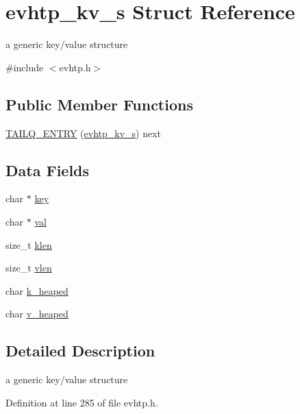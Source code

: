 \hypertarget{structevhtp__kv__s}{
\section{evhtp\_\-kv\_\-s Struct Reference}
\label{structevhtp__kv__s}
}


a generic key/value structure  




{\ttfamily \#include $<$evhtp.h$>$}

\subsection*{Public Member Functions}
\begin{DoxyCompactItemize}
\item 
\hyperlink{structevhtp__kv__s_aa91b5703eb0b48670753f5c6fa38acfe}{TAILQ\_\-ENTRY} (\hyperlink{structevhtp__kv__s}{evhtp\_\-kv\_\-s}) next
\end{DoxyCompactItemize}
\subsection*{Data Fields}
\begin{DoxyCompactItemize}
\item 
char $\ast$ \hyperlink{structevhtp__kv__s_a5892a9181e6a332f84d27aecd41dcd12}{key}
\item 
char $\ast$ \hyperlink{structevhtp__kv__s_a1d80a43cb41e5b550d4563dd10d302bc}{val}
\item 
size\_\-t \hyperlink{structevhtp__kv__s_a70d958290b8b8ebaff45365d4e5b9e54}{klen}
\item 
size\_\-t \hyperlink{structevhtp__kv__s_ac59966c92d67690ef79403b9b2feab88}{vlen}
\item 
char \hyperlink{structevhtp__kv__s_a42db189a7e6b042589175ca83abe94f1}{k\_\-heaped}
\item 
char \hyperlink{structevhtp__kv__s_a220b69df8f7b820814ebda4c2df899d8}{v\_\-heaped}
\end{DoxyCompactItemize}


\subsection{Detailed Description}
a generic key/value structure 

Definition at line 285 of file evhtp.h.



